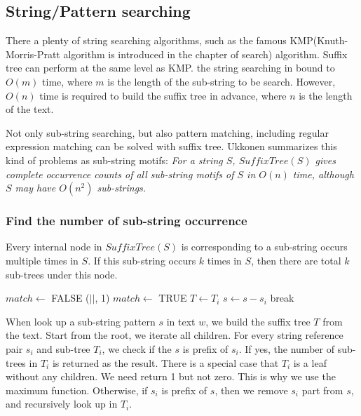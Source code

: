 \documentclass{article}
\begin{document}
\subsection{String/Pattern searching}
\label{substring-lookup}

There a plenty of string searching algorithms, such as the
famous KMP(Knuth-Morris-Pratt algorithm is introduced in the chapter of search)
algorithm. Suffix tree can perform at the same level as
KMP\cite{zhang-shaojie-lec}. the string searching in bound to $O(m)$ time,
where $m$ is the length of the sub-string to be search. However, $O(n)$ time is
required to build the suffix tree in advance, where $n$ is the length
of the text\cite{lallison-stree}.

Not only sub-string searching, but also pattern matching, including
regular expression matching can be solved with suffix tree. Ukkonen
summarizes this kind of problems as sub-string motifs:
{\em For a string $S$, $SuffixTree(S)$ gives complete occurrence
counts of all sub-string motifs of $S$ in $O(n)$ time, although $S$ may have
$O(n^2)$ sub-strings.}

\subsubsection{Find the number of sub-string occurrence}

Every internal node in $SuffixTree(S)$ is corresponding
to a sub-string occurs multiple times in $S$. If this sub-string occurs
$k$ times in $S$, then there are total $k$ sub-trees under this node\cite{ukkonen-lec}.

\begin{algorithmic}[1]
  \Loop
    \State $match \gets$ FALSE
        \State \Return {}($|$$|$, 1)
        \State $match \gets$ TRUE
        \State $T \gets T_i$
        \State $s \gets s - s_i$
        \State break
      \EndIf
    \EndFor
      \State {}
    \EndIf
  \EndLoop
\EndFunction
\end{algorithmic}

When look up a sub-string pattern $s$ in text $w$, we build the suffix tree $T$ from the
text. Start from the root, we iterate all children. For every
string reference pair $s_i$ and sub-tree $T_i$, we check if the $s$ is prefix of $s_i$.
If yes, the number of sub-trees in $T_i$ is returned as the result.
There is a special case that $T_i$ is a leaf without any children. We need return 1 but
not zero. This is why we use the maximum function.
Otherwise, if $s_i$ is prefix of $s$, then we remove $s_i$ part from $s$, and recursively
look up in $T_i$.
\end{document}
